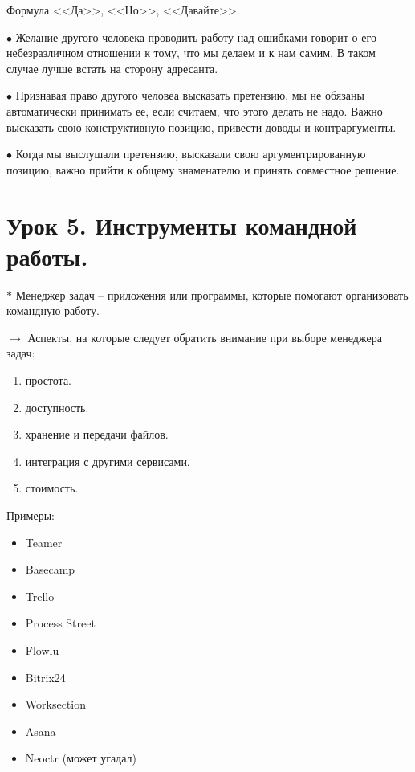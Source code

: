 \documentclass[12pt,a4paper]{report}
\begin{document}
\bigskip
{\large Формула <<Да>>, <<Но>>, <<Давайте>>.}

\medskip
$\bullet$ Желание другого человека проводить работу над ошибками говорит о его небезразличном отношении к тому, что мы делаем и к нам самим. В таком случае лучше встать на сторону адресанта.

\medskip 
$\bullet$ Признавая право другого человеа высказать претензию, мы не обязаны автоматически принимать ее, если считаем, что этого делать не надо. Важно высказать свою конструктивную позицию, привести доводы и контраргументы.

\medskip 
$\bullet$ Когда мы выслушали претензию, высказали свою аргументрированную позицию, важно прийти к общему знаменателю и принять совместное решение.

\medskip  
\section*{Урок 5. Инструменты командной работы.}
$\ast$ Менеджер задач -- приложения или программы, которые помогают организовать командную работу.

\bigskip
$\rightarrow$ Аспекты, на которые следует обратить внимание при выборе менеджера задач:
\begin{enumerate}
	\item простота.
	\item доступность.
	\item хранение и передачи файлов.
	\item интеграция с другими сервисами.
	\item стоимость.
\end{enumerate}

Примеры:

\bigskip
\begin{minipage}{0.4\textwidth}
	\begin{itemize}
		\item Teamer
		\item Basecamp
		\item Trello
		\item Process Street
		\item Flowlu
	\end{itemize}
\end{minipage}
\begin{minipage}{0.4\textwidth}
		\begin{itemize}
		\item Bitrix24
		\item Worksection
		\item Asana
		\item Neoctr (может угадал)
	\end{itemize}
\end{minipage}
\end{document}
